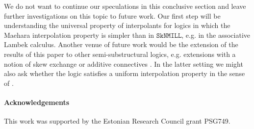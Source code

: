 \documentclass[sn-mathphys-num]{sn-jnl}%
\newcommand{\SkNMILL}{$\mathtt{SkNMILL}$}
\theoremstyle{thmstyleone}%
\theoremstyle{thmstyletwo}%
\theoremstyle{thmstylethree}%
\begin{document}
We do not want to continue our speculations in this conclusive section and leave further investigations on this topic to future work.
Our first step will be understanding the universal property of interpolants for logics in which the Maehara interpolation property is simpler than in \SkNMILL, e.g. in the associative Lambek calculus. 
Another venue of future work would be the  extension of the results of this paper to other semi-substructural logics, e.g. extensions with a notion of skew exchange \cite{veltri:coherence:2021} or additive connectives \cite{VW:2023}.
In the latter setting we might also ask whether the logic satisfies a uniform interpolation property in the sense of \cite{alizadeh:uniform:2014}.

\paragraph{Acknowledgements}
This work was supported by the Estonian Research Council grant PSG749.







\end{document}
